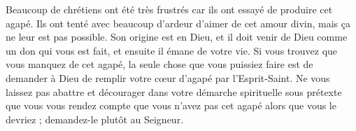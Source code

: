 Beaucoup de chrétiens ont été très frustrés car ils ont essayé
 de produire cet agapé.
 Ils ont tenté avec beaucoup d'ardeur d'aimer de cet amour divin,
 mais ça ne leur est pas possible. Son origine est en Dieu,
 et il doit venir de Dieu comme un don qui vous est fait,
 et ensuite il émane de votre vie. Si vous trouvez que vous manquez
 de cet agapé, la seule chose que vous puissiez faire est de demander à Dieu
 de remplir votre cœur d'agapé par l'Esprit-Saint.
 Ne vous laissez pas abattre et décourager
 dans votre démarche spirituelle
 sous prétexte que vous vous rendez compte que vous n'avez pas
 cet agapé alors que vous le devriez ;
 demandez-le plutôt au Seigneur.
\closechapter

